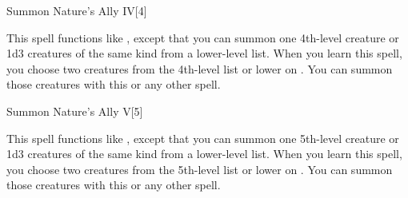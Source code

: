 \begin{spellsection}{Summon Nature's Ally IV}[4]
    \begin{spellheader}
    \end{spellheader}
    \begin{spellcontent}
        \begin{spelltargetinginfo}
        \end{spelltargetinginfo}
        \begin{spelleffects}
            \spellspecial This spell functions like , except that you can summon one 4th-level creature or 1d3 creatures of the same kind from a lower-level list. When you learn this spell, you choose two creatures from the 4th-level list or lower on . You can summon those creatures with this or any other  spell.
            \spelldur \durshort \dismissable
        \end{spelleffects}
    \end{spellcontent}
    \begin{spellfooter}
        \miscastexplode
    \end{spellfooter}
\end{spellsection}

\begin{spellsection}{Summon Nature's Ally V}[5]
    \begin{spellheader}
    \end{spellheader}
    \begin{spellcontent}
        \begin{spelltargetinginfo}
        \end{spelltargetinginfo}
        \begin{spelleffects}
            \spellspecial This spell functions like , except that you can summon one 5th-level creature or 1d3 creatures of the same kind from a lower-level list. When you learn this spell, you choose two creatures from the 5th-level list or lower on . You can summon those creatures with this or any other  spell.
            \spelldur \durshort \dismissable
        \end{spelleffects}
    \end{spellcontent}
    \begin{spellfooter}
        \miscastexplode
    \end{spellfooter}
\end{spellsection}

